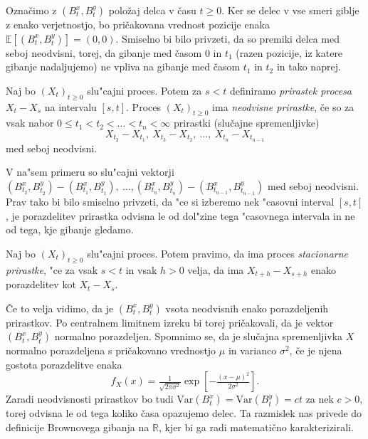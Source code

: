 \documentclass[twoside,11pt]{article}
\begin{document}
\noindent
Označimo z $\left(B^x_{t}, B^y_{t}\right)$ položaj delca v času $t \geq 0$. Ker se delec v vse 
smeri giblje z enako verjetnostjo, bo pričakovana vrednost pozicije enaka $\mathbb{E}\left[(B_t^x, B_t^y)\right] = (0, 0).$
Smiselno bi bilo privzeti, da so premiki delca med seboj neodvisni, torej, 
da gibanje med časom $0$ in $t_1$ (razen pozicije, iz katere gibanje nadaljujemo) ne vpliva na gibanje med časom $t_1$ in $t_2$ in tako naprej.

\begin{definicija}
    Naj bo $(X_t)_{t\geq0}$ slu"cajni proces. Potem za $s < t$ definiramo \textit{prirastek procesa} $X_t - X_s$ na 
    intervalu $[s, t]$. Proces $(X_t)_{t\geq0}$ ima \textit{neodvisne prirastke}, če so za vsak nabor 
    $0 \leq t_1 < t_2 < \ldots < t_n < \infty$ prirastki (slučajne spremenljivke)
    $$
        X_{t_2} - X_{t_1}, \ X_{t_3} - X_{t_2}, \ \ldots, \ X_{t_n} - X_{t_{n-1}}
    $$
    med seboj neodvisni.
\end{definicija}

\noindent
V na"sem primeru so slu"cajni vektorji $(B^x_{t_2}, B^y_{t_2}) - (B^x_{t_1}, B^y_{t_1}), \ \dots, (B^x_{t_n}, B^y_{t_n}) - (B^x_{t_{n-1}}, B^y_{t_{n-1}})$
med seboj neodvisni. Prav tako bi bilo smiselno privzeti, da "ce si izberemo nek "casovni interval $[s, t]$,
 je porazdelitev prirastka odvisna le od dol"zine tega "casovnega intervala in ne od tega, kje gibanje gledamo. 

\begin{definicija}
    Naj bo $(X_t)_{t\geq0}$ slu"cajni proces. Potem pravimo, da ima proces \textit{stacionarne prirastke}, "ce za vsak $s < t$ in vsak $h > 0$ velja, da ima $X_{t+h} - X_{s+h}$ enako porazdelitev kot $X_t - X_s$.
\end{definicija}

\noindent
Če to velja vidimo, da je $\left(B^x_{t}, B^y_{t}\right)$ vsota neodvisnih enako porazdeljenih prirastkov. Po centralnem 
limitnem izreku bi torej pričakovali, da je vektor $\left(B^x_{t}, B^y_{t}\right)$ normalno porazdeljen.
Spomnimo se, da je slučajna spremenljivka $X$ normalno porazdeljena s pričakovano vrednostjo $\mu$ in varianco $\sigma^2$, če
je njena gostota porazdelitve enaka
$$
    f_X(x) = \tfrac{1}{\sqrt{2\pi\sigma^2}}\exp\left[-\tfrac{(x-\mu)^2}{2\sigma^2}\right].
$$
Zaradi neodvisnosti prirastkov bo tudi $\text{Var}(B_t^x) = \text{Var}(B_t^y) = ct$ za nek $c>0$, torej odvisna le od tega koliko časa opazujemo delec.
Ta razmislek nas privede do definicije Brownovega gibanja na $\mathbb{R}$, kjer bi ga radi matematično karakterizirali.
\end{document}
